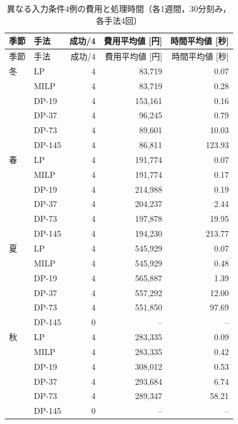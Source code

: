 \documentclass[a4paper,11pt,xelatex,ja=standard]{bxjsarticle}
\begin{document}
\clearpage
\begingroup
\small
\setlength{\tabcolsep}{3pt}
\begin{longtable}{llrrr}
    \caption{異なる入力条件4例の費用と処理時間（各1週間，30分刻み，各手法4回）}\label{tab:season} \\
    \toprule
    季節 & 手法     & 成功/4 & 費用平均値 [円] & 時間平均値 [秒]                      \\
    \midrule
    \endfirsthead
    \toprule
    季節 & 手法     & 成功/4 & 費用平均値 [円] & 時間平均値 [秒]                      \\
    \midrule
    \endhead
    冬  & LP     & 4    & 83,719    & 0.07                           \\
       & MILP   & 4    & 83,719    & 0.28                           \\
       & DP-19  & 4    & 153,161   & 0.16                           \\
       & DP-37  & 4    & 96,245    & 0.79                           \\
       & DP-73  & 4    & 89,601    & 10.03                          \\
       & DP-145 & 4    & 86,811    & 123.93                         \\
    \midrule
    春  & LP     & 4    & 191,774   & 0.07                           \\
       & MILP   & 4    & 191,774   & 0.17                           \\
       & DP-19  & 4    & 214,988   & 0.19                           \\
       & DP-37  & 4    & 204,237   & 2.44                           \\
       & DP-73  & 4    & 197,878   & 19.95                          \\
       & DP-145 & 4    & 194,230   & 213.77                         \\
    \midrule
    夏  & LP     & 4    & 545,929   & 0.07                           \\
       & MILP   & 4    & 545,929   & 0.48                           \\
       & DP-19  & 4    & 565,887   & 1.39                           \\
       & DP-37  & 4    & 557,292   & 12.00                          \\
       & DP-73  & 4    & 551,850   & 97.69                          \\
       & DP-145 & 0    & --        & --                             \\
    \midrule
    秋  & LP     & 4    & 283,335   & 0.09                           \\
       & MILP   & 4    & 283,335   & 0.42                           \\
       & DP-19  & 4    & 308,012   & 0.53                           \\
       & DP-37  & 4    & 293,684   & 6.74                           \\
       & DP-73  & 4    & 289,347   & 58.21                          \\
       & DP-145 & 0    & --        & --                             \\
    \bottomrule
\end{longtable}
\end{document}
